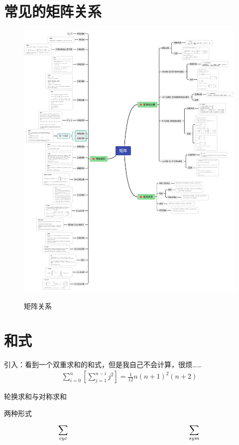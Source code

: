 \newpage
\section{常见的矩阵关系}
\begin{figure}[!htb]
    \includegraphics[scale=0.4]{Chapter/TikZ/矩阵.pdf}
    \label{矩阵}
    \caption{矩阵关系}
\end{figure}


\section{和式}
引入：看到一个双重求和的和式，但是我自己不会计算，很烦……
\begin{align*}
    \sum _{i=0}^n \left[\sum _{j=1}^{n-i} j^2\right]=\frac{1}{12} n (n+1)^2 (n+2)
\end{align*}

\textsf{轮换求和与对称求和}

两种形式
\[\sum_{cyc}^{}{}\hspace*{0.5\linewidth}\sum_{ sym}^{}{}\]

